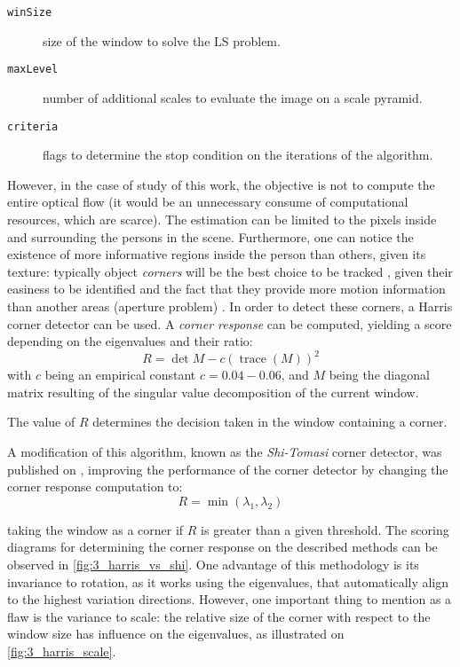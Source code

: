 \begin{description}
	\item[\texttt{winSize}] size of the window to solve the LS problem.
	\item[\texttt{maxLevel}] number of additional scales to evaluate the image on a scale pyramid.
	\item[\texttt{criteria}] flags to determine the stop condition on the iterations of the algorithm.
\end{description}

However, in the case of study of this work, the objective is not to compute the entire optical flow (it would be an unnecessary consume of computational resources, which are scarce). The estimation can be limited to the pixels inside and surrounding the persons in the scene. Furthermore, one can notice the existence of more informative regions inside the person than others, given its texture: typically object \textit{corners} will be the best choice to be tracked \cite{diapos_cv_features}, given their easiness to be identified and the fact that they provide more motion information than another areas (aperture problem) \cite{diapos_cv_motion_estimation}. In order to detect these corners, a Harris corner detector can be used. A \textit{corner response} can be computed, yielding a score depending on the eigenvalues and their ratio:
$$
R = \det M - c(\operatorname{trace}(M))^2
$$
with $c$ being an empirical constant $c=0.04-0.06$, and $M$ being the diagonal matrix resulting of the singular value decomposition of the current window.

The value of $R$ determines the decision taken in the window containing a corner.

A modification of this algorithm, known as the \textit{Shi-Tomasi} corner detector, was published on \cite{shi_tomasi}, improving the performance of the corner detector by changing the corner response computation to:
$$
R = \min(\lambda_1, \lambda_2)
$$

taking the window as a corner if $R$ is greater than a given threshold. The scoring diagrams for determining the corner response on the described methods can be observed in \autoref{fig:3_harris_vs_shi}. One advantage of this methodology is its invariance to rotation, as it works using the eigenvalues, that automatically align to the highest variation directions. However, one important thing to mention as a flaw is the variance to scale: the relative size of the corner with respect to the window size has influence on the eigenvalues, as illustrated on \autoref{fig:3_harris_scale}.\\


